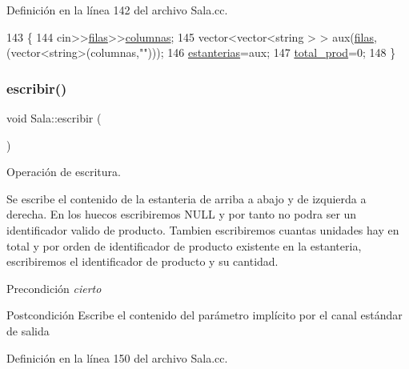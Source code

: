 Definición en la línea 142 del archivo Sala.\+cc.


\begin{DoxyCode}
143 \{
144   cin>>\hyperlink{class_sala_a4cccb03763eea3ebd6d192491b25f7dc}{filas}>>\hyperlink{class_sala_af3c278931f26e28e77fa363e9be82000}{columnas};
145   vector<vector<string > > aux(\hyperlink{class_sala_a4cccb03763eea3ebd6d192491b25f7dc}{filas},(vector<string>(columnas,\textcolor{stringliteral}{""})));
146   \hyperlink{class_sala_a88aae17b7e590770fe8115b41da2e26a}{estanterias}=aux;
147   \hyperlink{class_sala_aeb64df257f47ad63fe1ba3b163255e14}{total\_prod}=0;
148 \}
\end{DoxyCode}
\mbox{\label{class_sala_afd8421dde833322ed676c232e88cb77c}} 
\subsubsection{\texorpdfstring{escribir()}{escribir()}}
{\footnotesize\ttfamily void Sala\+::escribir (\begin{DoxyParamCaption}{ }\end{DoxyParamCaption})}



Operación de escritura. 

Se escribe el contenido de la estanteria de arriba a abajo y de izquierda a derecha. En los huecos escribiremos N\+U\+LL y por tanto no podra ser un identificador valido de producto. Tambien escribiremos cuantas unidades hay en total y por orden de identificador de producto existente en la estanteria, escribiremos el identificador de producto y su cantidad. \begin{DoxyPrecond}{Precondición}
{\itshape cierto} 
\end{DoxyPrecond}
\begin{DoxyPostcond}{Postcondición}
Escribe el contenido del parámetro implícito por el canal estándar de salida 
\end{DoxyPostcond}


Definición en la línea 150 del archivo Sala.\+cc.


